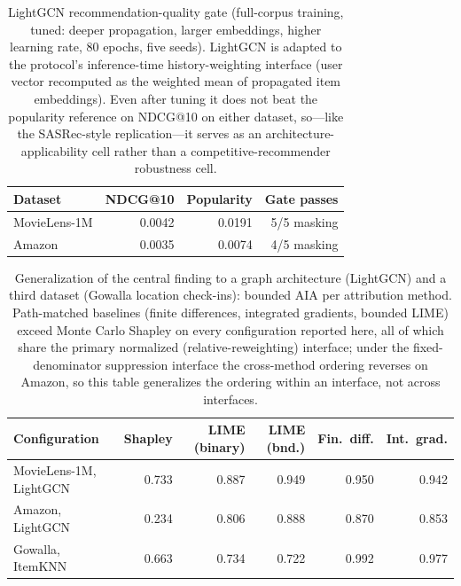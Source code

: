 \begin{table}[!htbp]\centering\scriptsize\setlength{\tabcolsep}{3pt}
\caption{LightGCN recommendation-quality gate (full-corpus training, tuned:
deeper propagation, larger embeddings, higher learning rate, 80 epochs, five
seeds). LightGCN is adapted to the protocol's inference-time history-weighting
interface (user vector recomputed as the weighted mean of propagated item
embeddings). Even after tuning it does not beat the popularity reference on
NDCG@10 on either dataset, so---like the SASRec-style replication---it serves
as an architecture-applicability cell rather than a competitive-recommender
robustness cell.}
\label{tab:review8-lightgcn-quality}
\begin{tabular}{@{}lrrr@{}}
\toprule
Dataset & NDCG@10 & Popularity & Gate passes \\
\midrule
MovieLens-1M & 0.0042 & 0.0191 & 5/5 masking \\
Amazon & 0.0035 & 0.0074 & 4/5 masking \\
\bottomrule\end{tabular}\end{table}
\begin{table}[!htbp]\centering\scriptsize\setlength{\tabcolsep}{3pt}
\caption{Generalization of the central finding to a graph architecture
(LightGCN) and a third dataset (Gowalla location check-ins): bounded AIA per
attribution method. Path-matched baselines (finite differences, integrated
gradients, bounded LIME) exceed Monte Carlo Shapley on every configuration reported here, all of which share the primary normalized (relative-reweighting) interface; under the fixed-denominator suppression interface the cross-method ordering reverses on Amazon, so this table generalizes the ordering within an interface, not across interfaces.}
\label{tab:review8-generalization}
\begin{tabular}{@{}lrrrrr@{}}
\toprule
Configuration & Shapley & LIME (binary) & LIME (bnd.) & Fin.\ diff. & Int.\ grad. \\
\midrule
MovieLens-1M, LightGCN & 0.733 & 0.887 & 0.949 & 0.950 & 0.942 \\
Amazon, LightGCN & 0.234 & 0.806 & 0.888 & 0.870 & 0.853 \\
Gowalla, ItemKNN & 0.663 & 0.734 & 0.722 & 0.992 & 0.977 \\
\bottomrule\end{tabular}\end{table}
